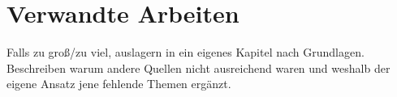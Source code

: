 \section{Verwandte Arbeiten}

Falls zu groß/zu viel, auslagern in ein eigenes Kapitel nach Grundlagen. Beschreiben warum andere Quellen nicht ausreichend waren und weshalb der eigene Ansatz jene fehlende Themen ergänzt.